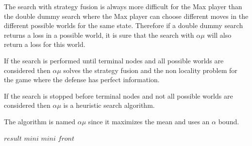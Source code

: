 \documentclass{ecai}
\begin{document}
The search with strategy fusion is always more difficult for the Max
player than the double dummy search where the Max player can choose
different moves in the different possible worlds for the same
state. Therefore if a double dummy search returns a loss in a possible
world, it is sure that the search with $\alpha\mu$ will also return a
loss for this world.

If the search is performed until terminal nodes and all possible
worlds are considered then $\alpha\mu$ solves the strategy fusion and
the non locality problem for the game where the defense has perfect
information.

If the search is stopped before terminal nodes and not all possible
worlds are considered then $\alpha\mu$ is a heuristic search
algorithm.

The algorithm is named $\alpha\mu$ since it maximizes the mean and
uses an $\alpha$ bound.

\begin{algorithm}
\begin{algorithmic}[1]
\begin{ALC@g}
\RETURN $result$
\ENDIF
{}
{}
\RETURN $mini$
\ENDIF
\ENDFOR
{}
\ENDFOR
{}
\RETURN $mini$
\ELSE
{}
\ENDFOR
{}
\ENDIF
\ENDIF
\ENDFOR
{}
\RETURN $front$
\ENDIF
\end{ALC@g}
\end{algorithmic}
\caption{\label{AlphaMuTT}The $\alpha\mu$ search algorithm with cuts and transposition table.}
\end{algorithm}
\end{document}
